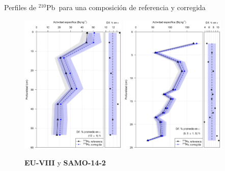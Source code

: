 \documentclass[9pt]{beamer}
\newcommand{\PbCero}{$^{210}$Pb}
\begin{document}
\begin{frame}{Perfiles de \PbCero\, para una composición de referencia y corregida}
	\begin{figure}
		\centering
		\includegraphics[width=0.45\textwidth]{Imagenes/Act_210Pb_Agua_Composicion_EU_VIII.png}
		\includegraphics[width=0.45\textwidth]{Imagenes/Act_210Pb_Agua_Composicion_SAMO-14-2.png}
		\caption{\textbf{EU-VIII} y \textbf{SAMO-14-2} }

	\end{figure}
\end{frame}
\end{document}
